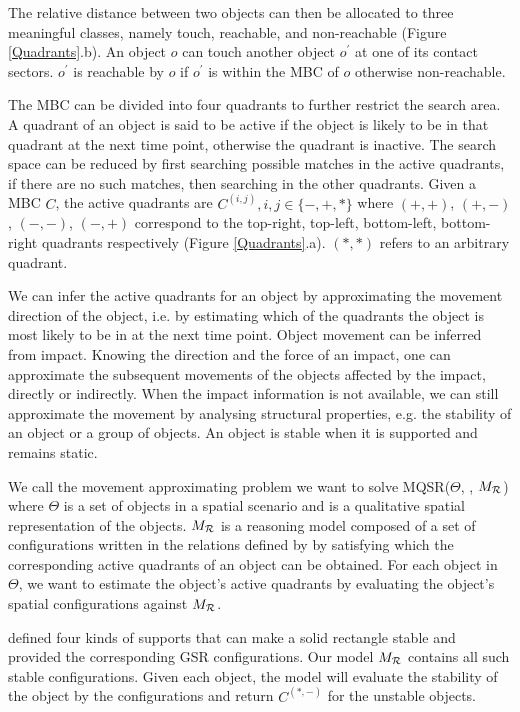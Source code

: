 \documentclass[letterpaper]{article}
\begin{document}
The relative distance between two objects can then be allocated to three meaningful classes, namely touch, reachable, and non-reachable (Figure \ref{Quadrants}.b). An object $o$ can touch another object $o^\prime$ at one of its contact sectors. $o^\prime$ is reachable by $o$ if $o^\prime$ is within the MBC of $o$ otherwise non-reachable. 

The MBC can be divided into four quadrants to further restrict the search area. A quadrant of an object is said to be active if the object is likely to be in that quadrant at the next time point, otherwise the quadrant is inactive. The search space can be reduced by first searching possible matches in the active quadrants, if there are no such matches, then searching in the other quadrants. Given a MBC $C$, the active quadrants are $C^{(i,j)}, i,j \in \{-, +, *\}$ where $(+,+)$, $(+,-)$, $(-,-)$, $(-,+)$ correspond to the top-right, top-left, bottom-left, bottom-right quadrants respectively (Figure \ref{Quadrants}.a). $(*, *)$ refers to an arbitrary quadrant. 

We can infer the active quadrants for an object by approximating the movement direction of the object, i.e. by estimating which of the quadrants the object is most likely to be in at the next time point. Object movement can be inferred from impact. Knowing the direction and the force of an impact, one can approximate the subsequent movements of the objects affected by the impact, directly or indirectly. When the impact information is not available, we can still approximate the movement by analysing structural properties, e.g. the stability of an object or a group of objects. An object is stable when it is supported and remains static. %

We call the movement approximating problem we want to solve MQSR($\Theta$, , $M_{\cal{R}}$) where $\Theta$ is a set of objects in a spatial scenario and  is a qualitative spatial representation of the objects. $M_{\cal{R}}$ is a reasoning model composed of a set of configurations written in the relations defined by  by satisfying which the corresponding active quadrants of an object can be obtained. For each object in $\Theta$, we want to estimate the object's active quadrants by evaluating the object's spatial configurations against $M_{\cal{R}}$.

\cite{Ge2013} defined four kinds of supports that can make a solid rectangle stable and provided the corresponding GSR configurations. Our model $M_{\cal R}$ contains all such stable configurations. Given each object, the model will evaluate the stability of the object by the configurations and return $C^{(*,-)}$ for the unstable objects.
\end{document}
